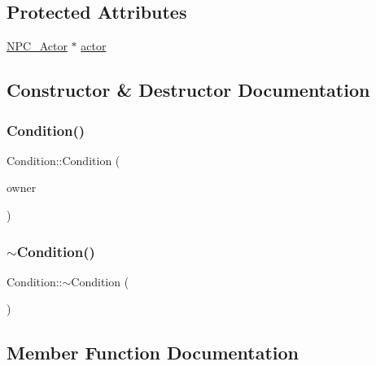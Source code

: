 \subsection*{Protected Attributes}
\begin{DoxyCompactItemize}
\item 
\hyperlink{classNPC__Actor}{N\+P\+C\+\_\+\+Actor} $\ast$ \hyperlink{classCondition_a95c8585457c094a8564ac5111e66620d}{actor}
\end{DoxyCompactItemize}


\subsection{Constructor \& Destructor Documentation}
\mbox{\label{classCondition_a85d4a561ea14b94cf86756a984936180}} 
\subsubsection{\texorpdfstring{Condition()}{Condition()}}
{\footnotesize\ttfamily Condition\+::\+Condition (\begin{DoxyParamCaption}\item[{\hyperlink{classNPC__Actor}{N\+P\+C\+\_\+\+Actor} $\ast$}]{owner }\end{DoxyParamCaption})\hspace{0.3cm}{\ttfamily [inline]}}

\mbox{\label{classCondition_ab42f6d2dfb2d0de4bed4ed5032d4a8fc}} 
\subsubsection{\texorpdfstring{$\sim$\+Condition()}{~Condition()}}
{\footnotesize\ttfamily Condition\+::$\sim$\+Condition (\begin{DoxyParamCaption}{ }\end{DoxyParamCaption})\hspace{0.3cm}{\ttfamily [inline]}}



\subsection{Member Function Documentation}
\mbox{\label{classCondition_a4826569fb7c6f920884abb7583a081b6}} 
